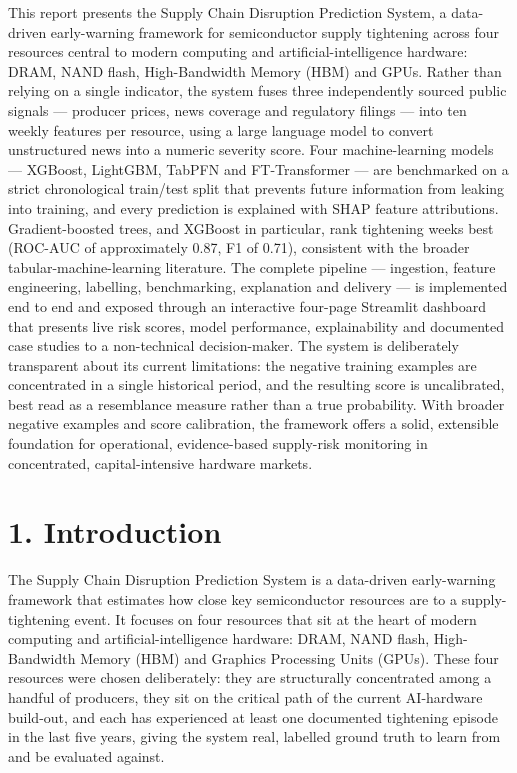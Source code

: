 \documentclass[11pt]{article}
\begin{document}
This report presents the Supply Chain Disruption Prediction System, a data-driven early-warning framework for semiconductor supply tightening across four resources central to modern computing and artificial-intelligence hardware: DRAM, NAND flash, High-Bandwidth Memory (HBM) and GPUs. Rather than relying on a single indicator, the system fuses three independently sourced public signals --- producer prices, news coverage and regulatory filings --- into ten weekly features per resource, using a large language model to convert unstructured news into a numeric severity score. Four machine-learning models --- XGBoost, LightGBM, TabPFN and FT-Transformer --- are benchmarked on a strict chronological train/test split that prevents future information from leaking into training, and every prediction is explained with SHAP feature attributions. Gradient-boosted trees, and XGBoost in particular, rank tightening weeks best (ROC-AUC of approximately 0.87, F1 of 0.71), consistent with the broader tabular-machine-learning literature. The complete pipeline --- ingestion, feature engineering, labelling, benchmarking, explanation and delivery --- is implemented end to end and exposed through an interactive four-page Streamlit dashboard that presents live risk scores, model performance, explainability and documented case studies to a non-technical decision-maker. The system is deliberately transparent about its current limitations: the negative training examples are concentrated in a single historical period, and the resulting score is uncalibrated, best read as a resemblance measure rather than a true probability. With broader negative examples and score calibration, the framework offers a solid, extensible foundation for operational, evidence-based supply-risk monitoring in concentrated, capital-intensive hardware markets.

\newpage

\section{1. Introduction}

The Supply Chain Disruption Prediction System is a data-driven early-warning framework that estimates how close key semiconductor resources are to a supply-tightening event. It focuses on four resources that sit at the heart of modern computing and artificial-intelligence hardware: DRAM, NAND flash, High-Bandwidth Memory (HBM) and Graphics Processing Units (GPUs). These four resources were chosen deliberately: they are structurally concentrated among a handful of producers, they sit on the critical path of the current AI-hardware build-out, and each has experienced at least one documented tightening episode in the last five years, giving the system real, labelled ground truth to learn from and be evaluated against.
\end{document}
